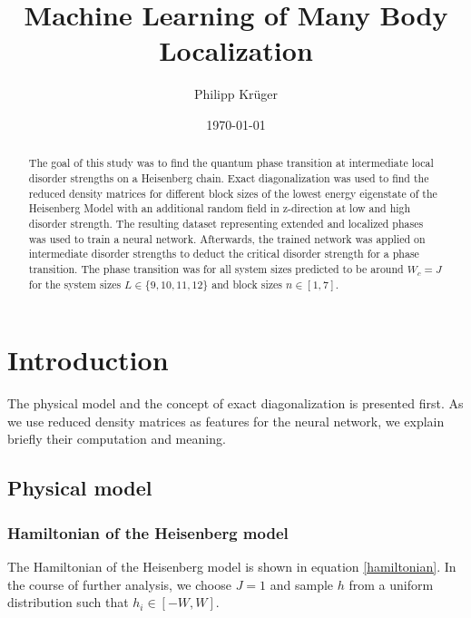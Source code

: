 \documentclass[reprint,amsmath,amssymb,aps,prb]{revtex4-2}
\begin{document}
%

\title{Machine Learning of Many Body Localization}

\author{Philipp Krüger}

\date{\today}%

\begin{abstract}
The goal of this study was to find the quantum phase transition at intermediate local disorder strengths on a Heisenberg chain. Exact diagonalization was used to find the reduced density matrices for different block sizes of the lowest energy eigenstate of the Heisenberg Model with an additional random field in z-direction at low and high disorder strength. The resulting dataset representing extended and localized phases was used to train a neural network. Afterwards, the trained network was applied on intermediate disorder strengths to deduct the critical disorder strength for a phase transition. The phase transition was for all system sizes predicted to be around $W_c = J$ for the system sizes $L\in\{9, 10, 11, 12\}$ and block sizes $n\in\left[1,7\right]$. %
\end{abstract}

\maketitle

\section{Introduction}

The physical model and the concept of exact diagonalization is presented first. As we use reduced density matrices as features for the neural network, we explain briefly their computation and meaning.
\subsection{Physical model}

\subsubsection{Hamiltonian of the Heisenberg model}

The Hamiltonian of the Heisenberg model is shown in equation \ref{hamiltonian}. In the course of further analysis, we choose $J=1$ and sample $h$ from a uniform distribution such that $h_i \in \left[-W, W\right]$.
\end{document}
